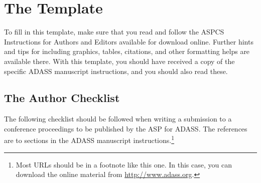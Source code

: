 \documentclass[11pt,twoside]{article}
\begin{document}



\section{The Template}
To fill in this template, make sure that you read and follow the ASPCS Instructions for Authors and Editors available for download online. Further hints and tips for including graphics, tables, citations, and other formatting helps are available there. With this template, you should have received a copy of the specific ADASS manuscript instructions, and you should also read these.

\subsection{The Author Checklist}
The following checklist should be followed when writing a submission to a conference proceedings to be published by the ASP for ADASS. The references are to sections in the ADASS manuscript instructions.\footnote{Most URLs should be in a footnote like this one.  In this case, you can download the online material from \url{http://www.adass.org}.} 
\end{document}
